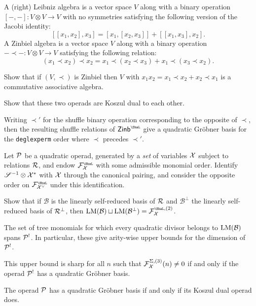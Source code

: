 \begin{question}
A (right) Leibniz algebra is a vector
space $V$ along with a binary operation
$[-,-]:V\otimes V \longrightarrow V$
with no symmetries satisfying the following
version of the Jacobi identity:
\[
[[x_1,x_2],x_3] = [x_1,[x_2,x_3]] 	
	+ [[x_1,x_3],x_2].
\]
A Zinbiel algebra is a vector
space $V$ along with a binary operation
$-\prec - : V\otimes V\longrightarrow V$
satisfying the following relation:
\[
(x_1\prec x_2)\prec x_2 = x_1\prec (x_2\prec x_3) + x_1\prec (x_3\prec x_2).
\]
\begin{tenumerate}
\item Show that if $(V,\prec)$ is Zinbiel
then $V$ with $x_1x_2 = x_1\prec x_2+x_2\prec x_1$ 
is a commutative associative algebra.
\item Show that these two operads are
Koszul dual to each other.
\item Writing $\prec'$ for the 
shuffle binary operation corresponding to the
opposite of $\prec$, then the resulting
shuffle relations of $\mathsf{Zinb}^\Sha$
give a quadratic Gr\"obner basis for the
\texttt{deglexperm} order where $\prec$
precedes $\prec'$.
\end{tenumerate}
\end{question}

\begin{question}\label{ex:quadratic-GB-dual} 
Let $\mathcal P$ be a quadratic operad, generated by a \emph{set}
of variables $\mathcal{X}$ subject to relations $\mathcal{R}$, 
and endow $\FF_\XX^\Sha$ with some
admissible monomial order. Identify $\mathscr{S}^{-1}\otimes \mathcal{X}^*$
with $\mathcal{X}$ through the canonical pairing, and consider
the opposite order on $\FF_{\XX^\vee}^\Sha$ 
under this identification.
\begin{tenumerate}
\item Show that if $\mathcal B$ is the linearly self-reduced
basis of $\mathcal{R}$ and $\mathcal B^\perp$ the linearly self-reduced
basis of $\mathcal{R}^\perp$, then $\leadm{\mathcal B}\sqcup
\leadm{\mathcal B^\perp} = \FF_\XX^{\Sha,(2)}$.
\item The set of tree monomials for which every quadratic divisor belongs to $\operatorname{LM}(\mathcal B)$ spans $\mathcal P^!$. In particular, these give
arity-wise upper bounds for the dimension of $\mathcal P^!$.
\item This upper bound is sharp for all $n$ such that $\mathcal{F}_{\mathcal{X}}^{\Sigma,(3)}(n) \neq 0$ if and only if the operad $\mathcal P^!$ has a quadratic 
Gr\"obner basis.
\item The operad  $\mathcal P$ has a quadratic 
Gr\"obner basis if and only if its Koszul dual operad does. 
\end{tenumerate}
\end{question}